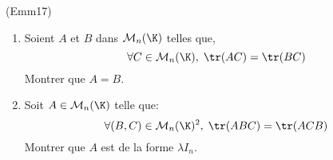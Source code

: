 \begin{tiny}(Emm17)\end{tiny}
\begin{enumerate}
 \item Soient $A$ et $B$ dans $\mathcal{M}_n(\K)$ telles que,
\begin{displaymath}
\forall C\in\mathcal{M}_n(\K),\; \tr (AC) =\tr (BC)  
\end{displaymath}
Montrer que $A=B$.
 \item Soit $A\in\mathcal{M}_n(\K)$ telle que:
\begin{displaymath}
 \forall (B,C)\in\mathcal{M}_n(\K)^2,\; \tr (ABC) =\tr(ACB)
\end{displaymath}
Montrer que $A$ est de la forme $\lambda I_n$.
\end{enumerate}
 